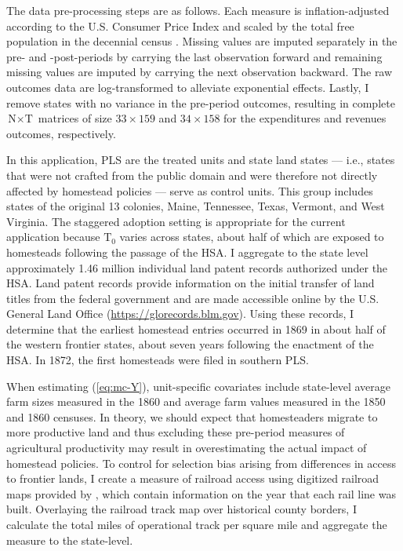 \documentclass[hidelinks,12pt]{article}
\begin{document}
The data pre-processing steps are as follows. Each measure is inflation-adjusted according to the U.S. Consumer Price Index \citep{williamson2017seven} and scaled by the total free population in the decennial census \citep{haines2010}. Missing values are imputed separately in the pre- and -post-periods by carrying the last observation forward and remaining missing values are imputed by carrying the next observation backward. The raw outcomes data are log-transformed to alleviate exponential effects. Lastly, I remove states with no variance in the pre-period outcomes, resulting in complete $\text{N} \times \text{T}$ matrices of size $33 \times 159$ and $34 \times 158$ for the expenditures and revenues outcomes, respectively. 

In this application, PLS are the treated units and state land states --- i.e., states that were not crafted from the public domain and were therefore not directly affected by homestead policies --- serve as control units. This group includes states of the original 13 colonies, Maine, Tennessee, Texas, Vermont, and West Virginia. The staggered adoption setting is appropriate for the current application because $\text{T}_0$ varies across states, about half of which are exposed to homesteads following the passage of the HSA. I aggregate to the state level approximately 1.46 million individual land patent records authorized under the HSA. Land patent records provide information on the initial transfer of land titles from the federal government and are made accessible online by the U.S. General Land Office (\url{https://glorecords.blm.gov}). Using these records, I determine that the earliest homestead entries occurred in 1869 in about half of the western frontier states, about seven years following the enactment of the HSA. In 1872, the first homesteads were filed in southern PLS.

When estimating (\ref{eq:mc-Y}), unit-specific covariates include state-level average farm sizes measured in the 1860 and average farm values measured in the 1850 and 1860 censuses. In theory, we should expect that homesteaders migrate to more productive land and thus excluding these pre-period measures of agricultural productivity may result in overestimating the actual impact of homestead policies. To control for selection bias arising from differences in access to frontier lands, I create a measure of railroad access using digitized railroad maps provided by \citet{atack2013use}, which contain information on the year that each rail line was built. Overlaying the railroad track map over historical county borders, I calculate the total miles of operational track per square mile and aggregate the measure to the state-level.
\end{document}
